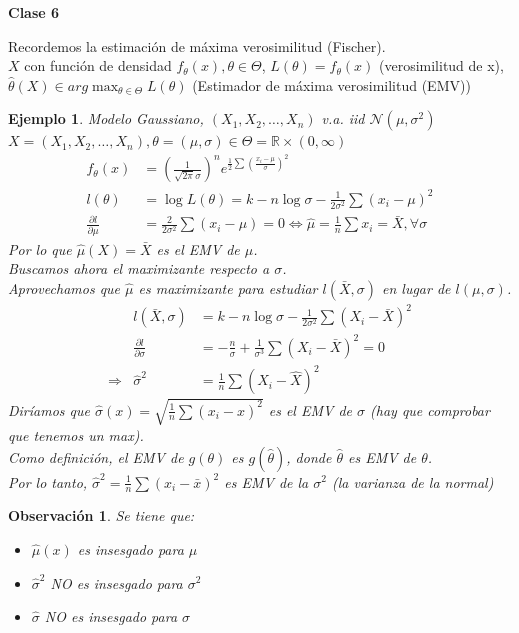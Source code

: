 \documentclass[10pt]{article}
\theoremstyle{plain}
\newtheorem{obs}{Observación}
\newtheorem{ej}{Ejemplo}
\theoremstyle{definition}
\newcommand{\catnum}{6} %
\begin{document}
\begin{center}
\LARGE\textbf{Clase \catnum}
\end{center}
Recordemos la estimación de máxima verosimilitud (Fischer).\\
$X$ con función de densidad $f_{\theta}(x), \theta \in \Theta$, $L(\theta) = f_{\theta}(x)$ (verosimilitud de x), $\hat{\theta}(X) \in arg\max_{\theta \in \Theta} L(\theta)$ (Estimador de máxima verosimilitud (EMV))
\begin{ej} Modelo Gaussiano, $(X_{1},X_{2},\ldots,X_{n})$ v.a. iid $\mathcal{N}(\mu, \sigma^2)$\\
$X = (X_{1},X_{2},\ldots,X_{n}), \theta = (\mu, \sigma) \in \Theta = \mathbb{R}\times (0,\infty)$
\begin{align*}
f_{\theta}(x) &= \left(\frac{1}{\sqrt{2\pi}\sigma}\right)^n e^{\frac{1}{2}\sum\left(\frac{x_{i}-\mu}{\sigma}\right)^2}\\
l(\theta) &= \log L(\theta) = k - n\log \sigma - \frac{1}{2\sigma^2}\sum\left(x_{i}-\mu\right)^2\\
\frac{\partial l}{\partial \mu} &= \frac{2}{2\sigma^2}\sum (x_{i}-\mu) = 0 \Leftrightarrow \hat{\mu} = \frac{1}{n}\sum x_{i} = \bar{X}, \forall \sigma
\end{align*}
Por lo que $\hat{\mu}(X) = \bar{X}$ es el EMV de $\mu$.\\
Buscamos ahora el maximizante respecto a $\sigma$.\\
Aprovechamos que $\hat{\mu}$ es maximizante para estudiar $l(\bar{X},\sigma)$ en lugar de $l(\mu, \sigma)$.\\
\begin{eqnarray*}
& l(\bar{X}, \sigma) & = k - n\log \sigma - \frac{1}{2\sigma^2}\sum(X_{i}-\bar{X})^2\\
& \frac{\partial l}{\partial \sigma} & = -\frac{n}{\sigma} + \frac{1}{\sigma^3}\sum (X_{i}-\bar{X})^2 = 0\\
\Rightarrow & \hat{\sigma}^2 & = \frac{1}{n}\sum (X_{i}-\hat{X})^2
\end{eqnarray*}
Diríamos que $\hat{\sigma}(x) = \sqrt{\frac{1}{n}\sum (x_{i}-\hat{x})^2}$ es el EMV de $\sigma$ (hay que comprobar que tenemos un max).\\
Como definición, el EMV de $g(\theta)$ es $g(\hat{\theta})$, donde $\hat{\theta}$ es EMV de $\theta$.\\
Por lo tanto, $\hat{\sigma}^2 = \frac{1}{n}\sum(x_{i}-\bar{x})^2$ es EMV de la $\sigma^2$ (la varianza de la normal)
\end{ej}
\begin{obs}Se tiene que:\\
\begin{itemize}
\item $\hat{\mu}(x)$ es insesgado para $\mu$
\item $\hat{\sigma}^2$ NO es insesgado para $\sigma^2$
\item $\hat{\sigma}$ NO es insesgado para $\sigma$
\end{itemize}
\end{obs}
\end{document}

